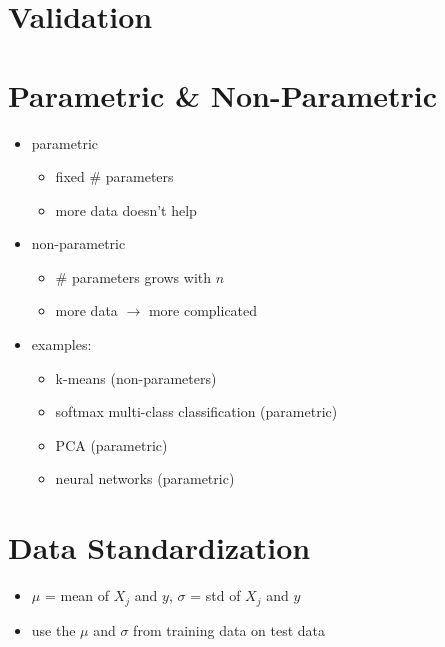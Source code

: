 \documentclass[10pt,landscape,a4paper]{article}
\begin{document}
\footnotesize
\begin{multicols*}{5}
\section{Validation}


\section{Parametric \& Non-Parametric}
\begin{itemize}
    \item parametric
    \begin{itemize}
        \item fixed \# parameters
        \item more data doesn't help
    \end{itemize}
    \item non-parametric
    \begin{itemize}
        \item \# parameters grows with \(n\)
        \item more data \(\rightarrow \)  more complicated
    \end{itemize}
    \item examples:
    \begin{itemize}
        \item k-means (non-parameters)
        \item softmax multi-class classification (parametric)
        \item PCA (parametric)
        \item neural networks (parametric)
    \end{itemize}
\end{itemize}

\section{Data Standardization}
\begin{itemize}
    \item \(\mu \) = mean of \(X_j\) and \(y\), \(\sigma \) = std of \(X_j\) and \(y\)
    \item use the \(\mu \) and \(\sigma \) from training data on test data
\end{itemize}

\end{multicols*}
\end{document}
